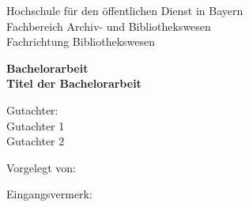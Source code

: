 \begin{titlepage}
	\singlespacing
	Hochschule für den öffentlichen Dienst in Bayern \\
	Fachbereich Archiv- und Bibliothekswesen \\
	Fachrichtung Bibliothekswesen \\
	\vspace{2cm}
	\begin{center}
		\textbf{Bachelorarbeit} \\
	    \vspace{2cm}
	    \textbf{Titel der Bachelorarbeit}
	\end{center}
	\vfill
	\begin{spacing}{2}
	Gutachter: \\
	Gutachter 1 \\
	Gutachter 2 \\
	\end{spacing}
	
	\vspace{2cm}
	
	\begin{minipage}[h]{7cm}
	Vorgelegt von: \\
	
	\end{minipage}
	\begin{minipage}[h]{7cm}
	Eingangsvermerk: \\
	
	\end{minipage}
\end{titlepage}